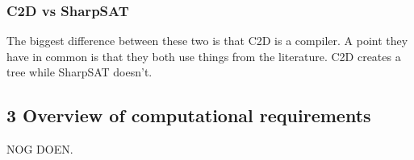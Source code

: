 \documentclass[a4paper,10pt]{report}
\begin{document}
\subsubsection*{C2D vs SharpSAT}
The biggest difference between these two is that C2D is a compiler. A point they have in common is that they both use things from the literature. C2D creates a tree while SharpSAT doesn't.

\subsection*{3 Overview of computational requirements}
NOG DOEN.



\end{document}
